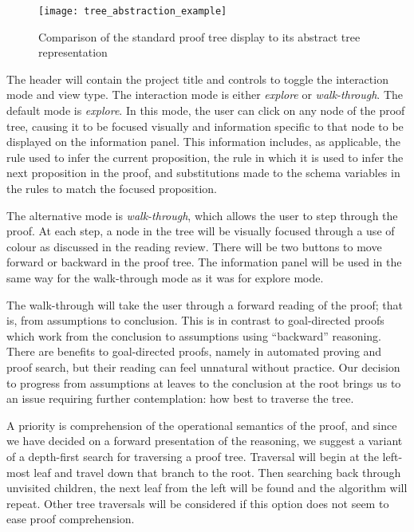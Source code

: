 \documentclass[12pt]{article}
\begin{document}
\begin{figure}

\begin{center}
\texttt{[image: tree\_abstraction\_example]}
\end{center}

\caption{Comparison of the standard proof tree display to its abstract tree representation}
\label{fig:tree-rep-comparison}
\end{figure}

The header will contain the project title and controls to toggle the interaction mode and view type. The interaction mode is either \textit{explore} or \textit{walk-through}. The default mode is \textit{explore}. In this mode, the user can click on any node of the proof tree, causing it to be focused visually and information specific to that node to be displayed on the information panel. This information includes, as applicable, the rule used to infer the current proposition, the rule in which it is used to infer the next proposition in the proof, and substitutions made to the schema variables in the rules to match the focused proposition.

The alternative mode is \textit{walk-through}, which allows the user to step through the proof. At each step, a node in the tree will be visually focused through a use of colour as discussed in the reading review. There will be two buttons to move forward or backward in the proof tree. The information panel will be used in the same way for the walk-through mode as it was for explore mode.

The walk-through will take the user through a forward reading of the proof; that is, from assumptions to conclusion. This is in contrast to goal-directed proofs which work from the conclusion to assumptions using ``backward'' reasoning. There are benefits to goal-directed proofs, namely in automated proving and proof search, but their reading can feel unnatural without practice. Our decision to progress from assumptions at leaves to the conclusion at the root brings us to an issue requiring further contemplation: how best to traverse the tree.

A priority is comprehension of the operational semantics of the proof, and since we have decided on a forward presentation of the reasoning, we suggest a variant of a depth-first search for traversing a proof tree. Traversal will begin at the left-most leaf and travel down that branch to the root. Then searching back through unvisited children, the next leaf from the left will be found and the algorithm will repeat. Other tree traversals will be considered if this option does not seem to ease proof comprehension.
\end{document}

